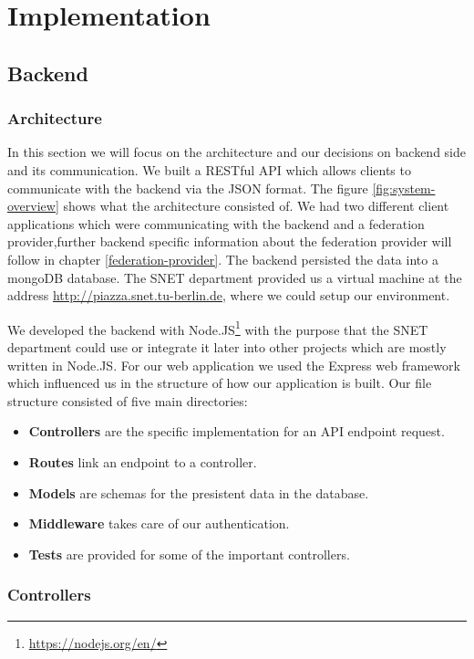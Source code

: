 \chapter{Implementation}
\label{cha:implementation}


\section{Backend}

\subsection{Architecture}

In this section we will focus on the architecture and our decisions on backend side and its communication. We built a RESTful API which allows clients to communicate with the backend via the JSON format. The figure \ref{fig:system-overview} shows what the architecture consisted of. We had two different client applications which were communicating with the backend and a federation provider,further backend specific information about the federation provider will follow in chapter \ref{federation-provider}. The backend persisted the data into a mongoDB database. The SNET department provided us a virtual machine at the address \url{http://piazza.snet.tu-berlin.de}, where we could setup our environment.

We developed the backend with Node.JS\footnote{\url{https://nodejs.org/en/}} with the purpose that the SNET department could use or integrate it later into other projects which are mostly written in Node.JS. For our web application we used the Express web framework which influenced us in the structure of how our application is built. Our file structure consisted of five main directories:
\begin{itemize}
  \item \textbf{Controllers} are the specific implementation for an API endpoint request.
  \item \textbf{Routes} link an endpoint to a controller.
  \item \textbf{Models} are schemas for the presistent data in the database.
  \item \textbf{Middleware} takes care of our authentication.
  \item \textbf{Tests} are provided for some of the important controllers.
\end{itemize}

\subsection{Controllers}

